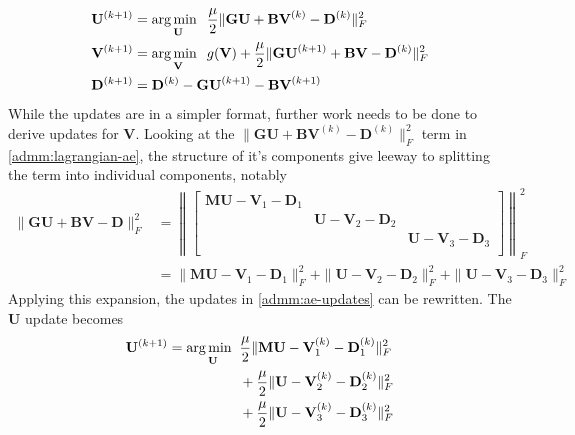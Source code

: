 \begin{equation}
  \label{admm:ae-updates}
  \begin{aligned}
    \mathbf{U}^{(k+1)} &= \operatorname*{arg\,min \;\;}_{\mathbf{U}}  \frac{\mu}{2} \|\mathbf{GU} + \mathbf{BV}^{(k)} - \mathbf{D}^{(k)}\|_F^2 \\
    \mathbf{V}^{(k+1)} &= \operatorname*{arg\,min \;\;}_{\mathbf{V}} g(\mathbf{V}) + \frac{\mu}{2} \|\mathbf{GU}^{(k+1)} + \mathbf{BV} - \mathbf{D}^{(k)}\|_F^2 \\
    \mathbf{D}^{(k+1)} &= \mathbf{D}^{(k)} - \mathbf{GU}^{(k+1)} - \mathbf{BV}^{(k+1)} 
    \end{aligned}
\end{equation}
While the updates are in a simpler format, further work needs to be done to derive updates for $\mathbf{V}$. Looking at the $\|\mathbf{GU} + \mathbf{BV}^{(k)} - \mathbf{D}^{(k)}\|_F^2$ term in \eqref{admm:lagrangian-ae}, the structure of it's components give leeway to splitting the term into individual components, notably
\begin{equation*}
  \begin{aligned}
    \|\mathbf{GU} + \mathbf{BV} - \mathbf{D}\|_F^2 &= 
    \left\lVert
    \begin{bmatrix}
    \mathbf{MU} - \mathbf{V}_1 - \mathbf{D}_1 &  &  \\
      &\mathbf{U} - \mathbf{V}_2 - \mathbf{D}_2&  \\
    &  & \mathbf{U} - \mathbf{V}_3 - \mathbf{D}_3 \\
    \end{bmatrix}
    \right\rVert^2_F \\
    &= \|\mathbf{MU} - \mathbf{V}_1 - \mathbf{D}_1\|_F^2 +
       \|\mathbf{U} - \mathbf{V}_2 - \mathbf{D}_2\|_F^2 +
       \|\mathbf{U} - \mathbf{V}_3 - \mathbf{D}_3\|_F^2 
  \end{aligned}
\end{equation*}
Applying this expansion, the updates in \eqref{admm:ae-updates} can be rewritten. The $\mathbf{U}$ update becomes
\begin{equation}
  \label{admm:ae-updates-u}
  \begin{aligned}
    \mathbf{U}^{(k+1)} = \operatorname*{arg\,min \;\;}_{\mathbf{U}}  & 
    \frac{\mu}{2} \|\mathbf{MU} - \mathbf{V}_1^{(k)} - \mathbf{D}_1^{(k)}\|_F^2 \\
    & + \frac{\mu}{2} \|\mathbf{U} - \mathbf{V}_2^{(k)} - \mathbf{D}_2^{(k)}\|_F^2 \\
    & + \frac{\mu}{2} \|\mathbf{U} - \mathbf{V}_3^{(k)} - \mathbf{D}_3^{(k)}\|_F^2 
  \end{aligned}
\end{equation}
